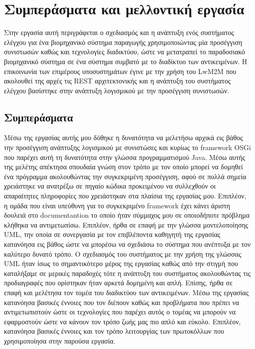 \chapter{ Συμπεράσματα και μελλοντική εργασία} %

\label{Chapter8}

 

\noindent Στην εργασία αυτή περιγράφεται ο σχεδιασμός και η ανάπτυξη ενός συστήματος ελέγχου για ένα βιομηχανικό σύστημα παραγωγής χρησιμοποιώντας μία προσέγγιση συνιστωσών καθώς και τεχνολογίες διαδικτύου, ώστε να μετατραπεί το παραδοσιακό βιομηχανικό σύστημα σε ένα σύστημα συμβατό με το διαδίκτυο των αντικειμένων. Η επικοινωνία των επιμέρους υποσυστημάτων έγινε με την χρήση του LwM2M που ακολουθεί της αρχές τις REST αρχιτεκτονικής και η ανάπτυξη του συστήματος ελέγχου βασίστηκε στην ανάπτυξη λογισμικού με την προσέγγιση συνιστωσών. 

\section{Συμπεράσματα}
Μέσω της εργασίας αυτής μου δόθηκε η δυνατότητα να μελετήσω αρχικά εις βάθος την προσέγγιση ανάπτυξης λογισμικού με συνιστώσες και κυρίως το framework OSGi που παρέχει αυτή τη δυνατότητα στην γλώσσα προγραμματισμού Java. Μέσω αυτής της μελέτης απέκτησα σπουδαία γνώση στον τρόπο με τον οποίο μπορεί να δομηθεί ένα πρόγραμμα ακολουθώντας την συγκεκριμένη προσέγγιση, αφού σε πολλά σημεία χρειάστηκε να ανατρέξω σε πηγαίο κώδικα προκειμένου να συλλεχθούν οι απαραίτητες πληροφορίες που χρειάστηκαν στα πλαίσια της εργασίας μου. Επιπλέον, η ομάδα που είναι υπεύθυνη για το συγκεκριμένο framework έχει κάνει άριστη δουλειά στο documentantion το οποίο ήταν σύμμαχος μου σε οποιοδήποτε πρόβλημα κλήθηκα να αντιμετωπίσω. Επιπλέον, ήρθα σε επαφή με την γλώσσα μοντελοποίησης UML, την οποία σε συνεργασία με τον επιβλέποντα καθηγητή της εργασίας κατανόησα εις βάθος ώστε να μπορέσω να σχεδιάσω το σύστημα που ανέπτυξα με τον καλύτερο δυνατό τρόπο. Ο σχεδιασμός του συστήματος με την χρήση της γλώσσας UML ήταν ίσως το σημαντικότερο μέρος της εργασίας καθώς από την στιγμή που καταλήξαμε σε μερικές παραδοχές τότε η ανάπτυξη του συστήματος ακολουθώντας τις προδιαγραφές που ορίστηκαν ήταν αρκετά δομημένη και απλή. Επίσης, ήρθα σε επαφή και μελέτησα τον τομέα του διαδικτύου των αντικειμένων. Μέσω της εργασίας κατανόησα βασικές έννοιες που τον διέπουν καθώς και προβλήματα που πρέπει να αντιμετωπιστούν ώστε οι τεχνολογίες που παρέχει αυτός ο τομέας να μπορούν να εφαρμοστούν ώστε να κάνουν τον τρόπο ζωής μας πιο απλό και εύκολο. Επιπλέον, κατανόησα βασικές έννοιες και τον τρόπο λειτουργίας των πρωτοκόλλων που χρησιμοποίησα στην παρούσα εργασία. 

